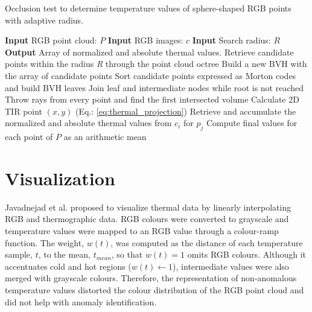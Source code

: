\begin{algorithm}[hbt]
	\caption{Occlusion test to determine temperature values of sphere-shaped RGB points with adaptive radius.}
	\label{alg:occlusion_test}
	\begin{algorithmic}[1]
    	\State \textbf{Input} RGB point cloud: $P$ %
    	\State \textbf{Input} RGB images: $c$ %
    	\State \textbf{Input} Search radius: $R$ %
        \State \textbf{Output} Array of normalized and absolute thermal values. %
		    \State Retrieve candidate points within the radius \textit{R} through the point cloud octree %
		    \State Build a new BVH with the array of candidate points %
		        \State Sort candidate points expressed as Morton codes and build BVH leaves %
		        \State Join leaf and intermediate nodes while root is not reached %
		    \EndProcedure
		        \State Throw rays from every point and find the first intersected volume %
		            \State Calculate 2D TIR point $(x, y)$ (Eq.: \ref{eq:thermal_projection}) %
		                \State Retrieve and accumulate the normalized and absolute thermal values from $c_i$ for $p_j$ %
	    	        \EndIf
	    	    \EndIf
		    \EndFor
		\EndFor
		\State Compute final values for each point of $P$ as an arithmetic mean %
	\end{algorithmic} 
\end{algorithm} 

\section{Visualization}

Javadnejad et al. \cite{javadnejad_photogrammetric_2020} proposed to visualize thermal data by linearly interpolating RGB and thermographic data. RGB colours were converted to grayscale and temperature values were mapped to an RGB value through a colour-ramp function. The weight, $w(t)$, was computed as the distance of each temperature sample, $t$, to the mean, $t_{mean}$, so that $w(t) = 1$ omits RGB colours. Although it accentuates cold and hot regions ($w(t) \gets 1$), intermediate values were also merged with grayscale colours. Therefore, the representation of non-anomalous temperature values distorted the colour distribution of the RGB point cloud and did not help with anomaly identification.

